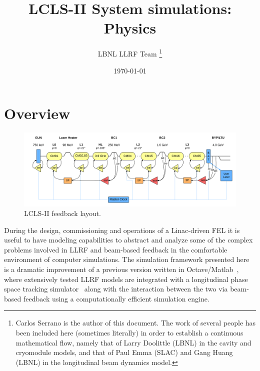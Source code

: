 \documentclass[a4paper,12pt]{article}
\begin{document}
\title{\textbf{LCLS-II System simulations:\\Physics}}
\author{LBNL LLRF Team \thanks{Carlos Serrano is the author of this document. The work of several people has been included here (sometimes literally) in order to establish a continuous mathematical flow, namely that of Larry Doolittle (LBNL) in the cavity and cryomodule models, and that of Paul Emma (SLAC) and Gang Huang (LBNL) in the longitudinal beam dynamics model.}}

\date{\today}

\maketitle
\setcounter{tocdepth}{2}
\tableofcontents

\newpage

\section{Overview}

\begin{figure}
\centering
\includegraphics[scale=0.11]{../figures/LCLS-II_feedback_layout.png}
\caption{LCLS-II feedback layout.}
\label{fig:lclsII-feedback_layout}
\end{figure}

During the design, commissioning and operations of a Linac-driven FEL it is useful to have modeling capabilities to abstract and analyze some of the complex problems involved in LLRF and beam-based feedback in the comfortable environment of computer simulations. The simulation framework presented here is a dramatic improvement of a previous version written in Octave/Matlab~\cite{ref:model-paper}, where extensively tested LLRF models are integrated with a longitudinal phase space tracking simulator~\cite{ref:litrack} along with the interaction between the two via beam-based feedback using a computationally efficient simulation engine.
\end{document}
